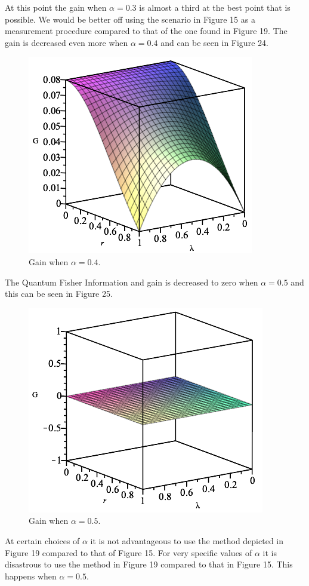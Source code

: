 \documentclass[twocolumn]{article}
\begin{document}
At this point the gain when $\alpha=0.3$ is almost a third at the best point that is possible. We would be better off using the scenario in Figure 15 as a measurement procedure compared to that of the one found in Figure 19. The gain is decreased even more when $\alpha=0.4$ and can be seen in Figure 24.
\begin{figure}[h]
\begin{center}
\includegraphics[width=0.65\linewidth]{Phase-Flip-Two-Channel-Alpha=04-Gain.png}
\caption{Gain when $\alpha=0.4$.}
\end{center}
\end{figure}
\newline
The Quantum Fisher Information and gain is decreased to zero when $\alpha=0.5$ and this can be seen in Figure 25.
\newpage
\begin{figure}[h]
\begin{center}
\includegraphics[width=0.65\linewidth]{Phase-Flip-Two-Channel-Alpha=05-Gain.png}
\caption{Gain when $\alpha=0.5$.}
\end{center}
\end{figure}
At certain choices of $\alpha$ it is not advantageous to use the method depicted in Figure 19 compared to that of Figure 15. For very specific values of $\alpha$ it is disastrous to use the method in Figure 19 compared to that in Figure 15. This happens when $\alpha=0.5$. 
\end{document}
